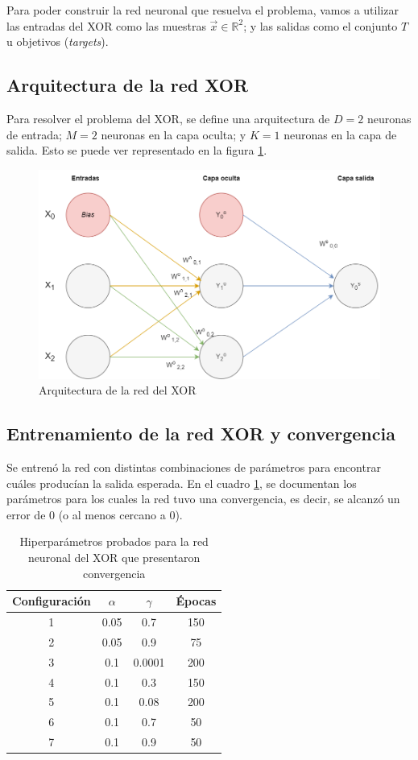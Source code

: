 \documentclass{article}
\begin{document}
Para poder construir la red neuronal que resuelva el problema, vamos a utilizar las entradas del XOR como las muestras $\vec{x}\in \mathbb{R}^2$; y las salidas como el conjunto $T$ u objetivos (\textit{targets}).

\subsection{Arquitectura de la red XOR}

Para resolver el problema del XOR, se define una arquitectura de $D=2$ neuronas de entrada; $M=2$ neuronas en la capa oculta; y $K=1$ neuronas en la capa de salida. Esto se puede ver representado en la figura \ref{fig:xor_arqui}.

\begin{figure}[htbp]
    \centering
    \includegraphics[width=0.5 \textwidth]{imgs/XOR/xor_arquitecture.png}
    \caption{Arquitectura de la red del XOR}
    \label{fig:xor_arqui}
\end{figure}

\subsection{Entrenamiento de la red  XOR y convergencia}

Se entrenó la red con distintas combinaciones de parámetros para encontrar cuáles producían la salida esperada. En el cuadro \ref{tab:xor_converge_table}, se documentan los parámetros para los cuales la red tuvo una convergencia, es decir, se alcanzó un error de $0$ (o al menos cercano a 0).

\begin{table}[!ht]
\centering
\begin{tabular}{c|c|c|c}
\hline
\textbf{Configuración} & \textbf{$\alpha$} & \textbf{$\gamma$} & \textbf{Épocas} \\
\hline
1 & 0.05 & 0.7 & 150 \\
2 & 0.05 & 0.9 & 75 \\
3 & 0.1 & 0.0001 & 200 \\
4 & 0.1 & 0.3 & 150 \\
5 & 0.1 & 0.08 & 200 \\
6 & 0.1 & 0.7 & 50 \\
7 & 0.1 & 0.9 & 50 \\
\hline
\end{tabular}
\caption{Hiperparámetros probados para la red neuronal del XOR que presentaron convergencia}
\label{tab:xor_converge_table}
\end{table}
\end{document}
